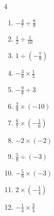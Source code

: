 \begin{multicols}{4}
\begin{enumerate}
  \item $\displaystyle -\frac{4}{7}\div{}\frac{8}{9}$


  \item $\displaystyle \frac{1}{2}\div{}\frac{1}{10}$

        \phantom{$\displaystyle =5$}

  \item $\displaystyle 1\div{}\left(-\frac{7}{9}\right)$


  \item $\displaystyle -\frac{3}{8}\times{}\frac{1}{3}$


  \item $\displaystyle -\frac{9}{8}\div{}3$


  \item $\displaystyle \frac{2}{9}\times{}\left(-10\right)$


  \item $\displaystyle \frac{6}{7}\times{}\left(-\frac{1}{6}\right)$


\columnbreak %

  \item $\displaystyle -2\times{}\left(-2\right)$

        \phantom{$\displaystyle =4$}

  \item $\displaystyle \frac{5}{8}\div{}\left(-3\right)$


  \item $\displaystyle -\frac{5}{9}\times{}\left(-3\right)$


  \item $\displaystyle 2\times{}\left(-\frac{1}{4}\right)$


  \item $\displaystyle -\frac{1}{4}\times{}\frac{3}{4}$


\end{enumerate}
\end{multicols}
